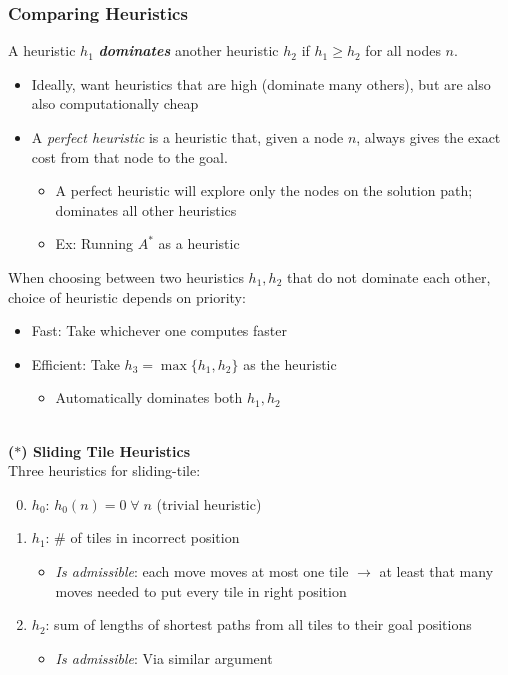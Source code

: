 \documentclass[12pt]{extarticle}
\theoremstyle{definition}
\theoremstyle{remark}
\newcommand{\pstart}[0]{\noindent}
\newcommand{\newp}[0]{~\\ \pstart}
\newcommand{\term}[1]{\noindent\textbf{\textit{#1}}}
\begin{document}
\subsubsection{Comparing Heuristics}
A heuristic $h_1$ \term{dominates} another heuristic $h_2$ if $h_1\geq h_2$ for all nodes $n$. \begin{itemize}
    \item Ideally, want heuristics that are high (dominate many others), but are also also computationally cheap
    \item A \textit{perfect heuristic} is a heuristic that, given a node $n$, always gives the exact cost from that node to the goal. \begin{itemize}
        \item A perfect heuristic will explore only the nodes on the solution path; dominates all other heuristics
        \item Ex: Running $A^\ast$ as a heuristic
    \end{itemize}
\end{itemize}

\pstart
When choosing between two heuristics $h_1,h_2$ that do not dominate each other, choice of heuristic depends on priority: \begin{itemize}
    \item Fast: Take whichever one computes faster
    \item Efficient: Take \ul{$h_3=\max\{h_1,h_2\}$} as the heuristic \begin{itemize}
        \item Automatically dominates both $h_1,h_2$
    \end{itemize}
\end{itemize}

\newp
\textbf{($\ast$) Sliding Tile Heuristics}
\vspace{6pt}\newp
Three heuristics for sliding-tile: \begin{enumerate}
    \setcounter{enumi}{-1}
    \item $h_0$: $h_0(n)=0\;\forall\;n$ (trivial heuristic)
    \item $h_1$: \# of tiles in incorrect position \begin{itemize}
        \item \textit{Is admissible}: each move moves at most one tile $\to$ at least that many moves needed to put every tile in right position
    \end{itemize}
    \item $h_2$: sum of lengths of shortest paths from all tiles to their goal positions \begin{itemize}
        \item \textit{Is admissible}: Via similar argument
    \end{itemize}
\end{enumerate}
\end{document}
